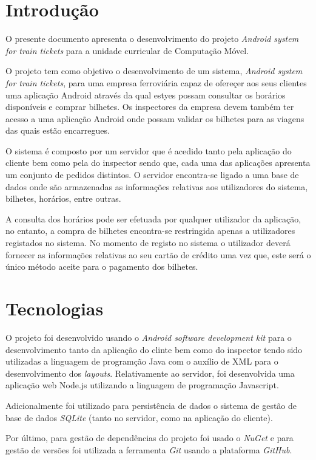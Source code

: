 \documentclass[12pt]{article}
\begin{document}
\newpage

\section{Introdução}

O presente documento apresenta o desenvolvimento do projeto \textit{Android system for train tickets} para a unidade curricular de Computação Móvel.

O projeto tem como objetivo o desenvolvimento de um sistema, \textit{Android system for train tickets}, para uma empresa ferroviária capaz de ofereçer aos seus clientes uma aplicação Android através da qual estyes possam consultar os horários disponíveis e comprar bilhetes. Os inspectores da empresa devem também ter acesso a uma aplicação Android onde possam validar os bilhetes para as viagens das quais estão encarregues.  

O sistema é composto por um servidor que é acedido tanto pela aplicação do cliente bem como pela do inspector sendo que, cada uma das aplicações apresenta um conjunto de pedidos distintos. O servidor encontra-se ligado a uma base de dados onde são armazenadas as informações relativas aos utilizadores do sistema, bilhetes, horários, entre outras.

A consulta dos horários pode ser efetuada por qualquer utilizador da aplicação, no entanto, a compra de bilhetes encontra-se restringida apenas a utilizadores registados no sistema. No momento de registo no sistema o utilizador deverá fornecer as informações relativas ao seu cartão de crédito uma vez que, este será o único método aceite para o pagamento dos bilhetes.


\section{Tecnologias}

O projeto foi desenvolvido usando o \textit{Android software development kit} para o desenvolvimento tanto da aplicação do clinte bem como do inspector tendo sido utilizadas a linguagem de programção Java com o auxílio de XML para o desenvolvimento dos \textit{layouts}. Relativamente ao servidor, foi desenvolvida uma aplicação web Node.js utilizando a linguagem de programação Javascript.

Adicionalmente foi utilizado para persistência de dados o sistema de gestão de base de dados \textit{SQLite} (tanto no servidor, como na aplicação do cliente).

Por último, para gestão de dependências do projeto foi usado o \textit{NuGet} e para gestão de versões foi utilizada a ferramenta \textit{Git} usando a plataforma \textit{GitHub}.
\end{document}

